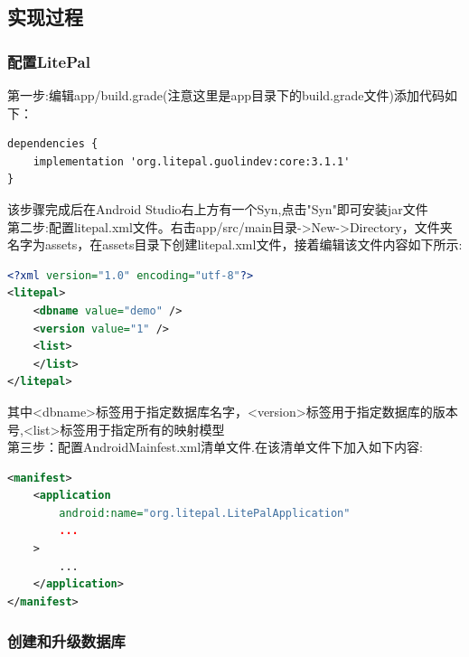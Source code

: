 \documentclass[cs4size,a4paper]{ctexart}
\numberwithin{equation}{section}
\numberwithin{table}{section}
\numberwithin{figure}{section}
\begin{document}
\subsection{实现过程}


\subsubsection{配置LitePal}

第一步:编辑app/build.grade(注意这里是app目录下的build.grade文件)添加代码如下：
\begin{lstlisting}[language=xml]
dependencies {
    implementation 'org.litepal.guolindev:core:3.1.1'
}
\end{lstlisting}
该步骤完成后在Android Studio右上方有一个Syn,点击"Syn"即可安装jar文件
~\\

第二步:配置litepal.xml文件。右击app/src/main目录->New->Directory，文件夹名字为assets，在assets目录下创建litepal.xml文件，接着编辑该文件内容如下所示:

\begin{lstlisting}[language=xml]
<?xml version="1.0" encoding="utf-8"?>
<litepal>
    <dbname value="demo" />
    <version value="1" />
    <list>
    </list>
</litepal>
\end{lstlisting}
其中<dbname>标签用于指定数据库名字，<version>标签用于指定数据库的版本号,<list>标签用于指定所有的映射模型
~\\

第三步：配置AndroidMainfest.xml清单文件.在该清单文件下加入如下内容:

\begin{lstlisting}[language=xml]
<manifest>
    <application
        android:name="org.litepal.LitePalApplication"
        ...
    >
        ...
    </application>
</manifest>
\end{lstlisting}

\subsubsection{创建和升级数据库}
\end{document}
